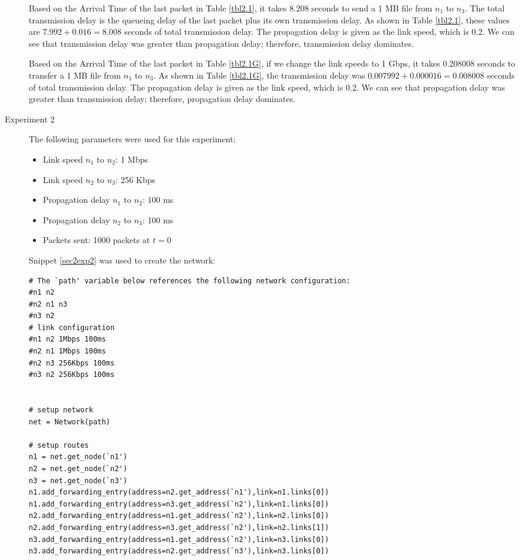 \documentclass[11pt]{article}
\begin{document}
\begin{description}
Based on the Arrival Time of the last packet in Table \ref{tbl2.1}, it takes 8.208 seconds to send a 1 MB file from $n_1$ to $n_3$. The total transmission delay is the queueing delay of the last packet plus its own transmission delay. As shown in Table \ref{tbl2.1}, these values are $7.992 + 0.016 = 8.008$ seconds of total transmission delay. The propagation delay is given as the link speed, which is 0.2. We can see that transmission delay was greater than propagation delay; therefore, transmission delay dominates.

Based on the Arrival Time of the last packet in Table \ref{tbl2.1G}, if we change the link speeds to 1 Gbps, it takes 0.208008 seconds to transfer a 1 MB file from $n_1$ to $n_3$. As shown in Table \ref{tbl2.1G}, the transmission delay was $0.007992 + 0.000016 = 0.008008$ seconds of total transmission delay. The propagation delay is given as the link speed, which is 0.2. We can see that propagation delay was greater than transmission delay; therefore, propagation delay dominates.

\item[Experiment 2] \hfill \break
The following parameters were used for this experiment:

\begin{itemize}
\item Link speed $n_1$ to $n_2$: 1 Mbps
\item Link speed $n_2$ to $n_3$: 256 Kbps
\item Propagation delay $n_1$ to $n_2$: 100 ms
\item Propagation delay $n_2$ to $n_3$: 100 ms
\item Packets sent: 1000 packets at $t = 0$
\end{itemize}

\medskip

Snippet \ref{sec2exp2} was used to create the network:

\medskip

\begin{lstlisting}[caption={Network 2.2},label=sec2exp2]
# The `path' variable below references the following network configuration:
#n1 n2
#n2 n1 n3
#n3 n2
# link configuration
#n1 n2 1Mbps 100ms
#n2 n1 1Mbps 100ms
#n2 n3 256Kbps 100ms
#n3 n2 256Kbps 100ms


# setup network
net = Network(path)

# setup routes
n1 = net.get_node(`n1')
n2 = net.get_node(`n2')
n3 = net.get_node(`n3')
n1.add_forwarding_entry(address=n2.get_address(`n1'),link=n1.links[0])
n1.add_forwarding_entry(address=n3.get_address(`n2'),link=n1.links[0])
n2.add_forwarding_entry(address=n1.get_address(`n2'),link=n2.links[0])
n2.add_forwarding_entry(address=n3.get_address(`n2'),link=n2.links[1])
n3.add_forwarding_entry(address=n1.get_address(`n2'),link=n3.links[0])
n3.add_forwarding_entry(address=n2.get_address(`n3'),link=n3.links[0])


\end{lstlisting}
\end{description}
\end{document}
